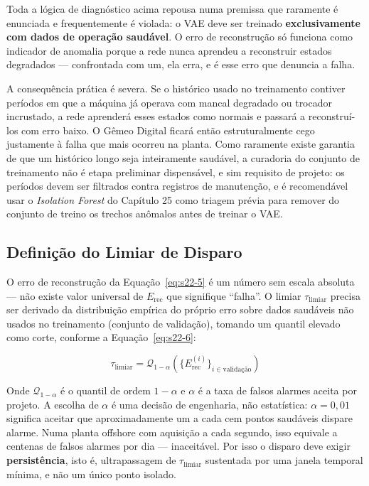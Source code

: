 \documentclass[12pt,a4paper]{article}
\numberwithin{equation}{section}
\numberwithin{table}{section}
\numberwithin{figure}{section}
\begin{document}
	Toda a lógica de diagnóstico acima repousa numa premissa que raramente é enunciada e frequentemente é violada: o VAE deve ser treinado \textbf{exclusivamente com dados de operação saudável}. O erro de reconstrução só funciona como indicador de anomalia porque a rede nunca aprendeu a reconstruir estados degradados — confrontada com um, ela erra, e é esse erro que denuncia a falha.

	A consequência prática é severa. Se o histórico usado no treinamento contiver períodos em que a máquina já operava com mancal degradado ou trocador incrustado, a rede aprenderá esses estados como normais e passará a reconstruí-los com erro baixo. O Gêmeo Digital ficará então estruturalmente cego justamente à falha que mais ocorreu na planta. Como raramente existe garantia de que um histórico longo seja inteiramente saudável, a curadoria do conjunto de treinamento não é etapa preliminar dispensável, e sim requisito de projeto: os períodos devem ser filtrados contra registros de manutenção, e é recomendável usar o \textit{Isolation Forest} do Capítulo 25 como triagem prévia para remover do conjunto de treino os trechos anômalos antes de treinar o VAE.

	\subsection{Definição do Limiar de Disparo}

	O erro de reconstrução da Equação~\eqref{eq:s22-5} é um número sem escala absoluta — não existe valor universal de $E_{\text{rec}}$ que signifique ``falha''. O limiar $\tau_{\text{limiar}}$ precisa ser derivado da distribuição empírica do próprio erro sobre dados saudáveis não usados no treinamento (conjunto de validação), tomando um quantil elevado como corte, conforme a Equação~\eqref{eq:s22-6}:

	\begin{equation}\label{eq:s22-6}
	\tau_{\text{limiar}} = \mathcal{Q}_{1-\alpha}\left( \{ E_{\text{rec}}^{(i)} \}_{i \in \text{validação}} \right)
\end{equation}

	Onde $\mathcal{Q}_{1-\alpha}$ é o quantil de ordem $1-\alpha$ e $\alpha$ é a taxa de falsos alarmes aceita por projeto. A escolha de $\alpha$ é uma decisão de engenharia, não estatística: $\alpha = 0{,}01$ significa aceitar que aproximadamente um a cada cem pontos saudáveis dispare alarme. Numa planta offshore com aquisição a cada segundo, isso equivale a centenas de falsos alarmes por dia — inaceitável. Por isso o disparo deve exigir \textbf{persistência}, isto é, ultrapassagem de $\tau_{\text{limiar}}$ sustentada por uma janela temporal mínima, e não um único ponto isolado.
\end{document}
